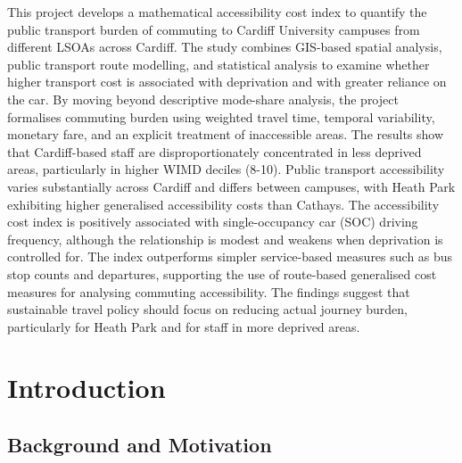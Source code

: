 \documentclass[11pt,a4paper]{article}
\begin{document}
This project develops a mathematical accessibility cost index to quantify
the public transport burden of commuting to Cardiff University campuses from
different LSOAs across Cardiff. The study combines GIS-based spatial analysis,
public transport route modelling, and statistical analysis to examine whether
higher transport cost is associated with deprivation and with greater reliance
on the car. By moving beyond descriptive mode-share analysis, the project
formalises commuting burden using weighted travel time, temporal variability,
monetary fare, and an explicit treatment of inaccessible areas.
The results show that Cardiff-based staff are disproportionately concentrated in less deprived areas, particularly in higher WIMD deciles (8-10). Public transport accessibility varies substantially across Cardiff and differs between campuses, with Heath Park exhibiting higher generalised accessibility costs than Cathays. The accessibility cost index is positively associated with single-occupancy car (SOC) driving frequency, although the relationship is modest and weakens when deprivation is controlled for. The index outperforms simpler service-based measures such as bus stop counts and departures, supporting the use of route-based generalised cost measures for analysing commuting accessibility. The findings suggest that sustainable travel policy should focus on reducing actual journey burden, particularly for Heath Park and for staff in more deprived areas.

\newpage
\tableofcontents
\newpage


\section{Introduction}

\subsection{Background and Motivation}
\end{document}
